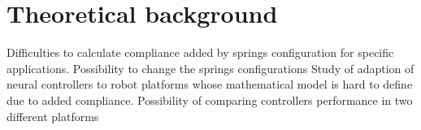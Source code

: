 
\section{Theoretical background}
\label{sec_theoretical_background}



Difficulties to calculate compliance added by springs configuration for specific applications.
Possibility to change the springs configurations
Study of adaption of neural controllers to robot platforms whose mathematical model is hard to define due to added compliance.
Possibility of comparing controllers performance in two different platforms
